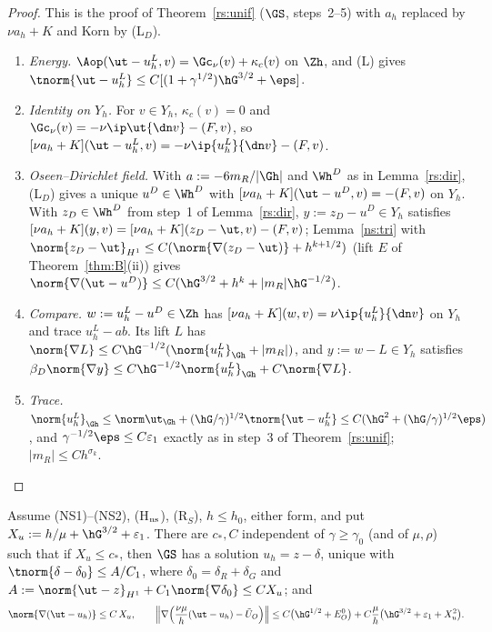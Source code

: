 \begin{proof}
This is the proof of Theorem~\ref{rs:unif} ($\GS$, steps~2--5) with $a_h$ replaced by $\nu a_h+K$ and Korn by (L$_D$).
\begin{enumerate}
\item \emph{Energy.} $\Aop(\ut-u^L_h,v)=\Gc_\nu(v)+\kappa_c(v)$ on $\Zh$, and (L) gives $\tnorm{\ut-u^L_h}\le C[(1+\gamma^{1/2})\hG^{3/2}+\eps]$.
\item \emph{Identity on $Y_h$.} For $v\in Y_h$, $\kappa_c(v)=0$ and $\Gc_\nu(v)=-\nu\ip\ut{\dn v}-(F,v)$, so
$[\nu a_h+K](\ut-u^L_h,v)=-\nu\ip{u^L_h}{\dn v}-(F,v)$.
\item \emph{Oseen--Dirichlet field.} With $a:=-6m_R/|\Gh|$ and $\Wh^D$ as in Lemma~\ref{rs:dir}, (L$_D$) gives a unique $u^D\in\Wh^D$ with
$[\nu a_h+K](\ut-u^D,v)=-(F,v)$ on $Y_h$. With $z_D\in\Wh^D$ from step~1 of Lemma~\ref{rs:dir}, $y:=z_D-u^D\in Y_h$ satisfies
$[\nu a_h+K](y,v)=[\nu a_h+K](z_D-\ut,v)-(F,v)$; Lemma~\ref{ns:tri} with $\norm{z_D-\ut}_{H^1}\le C(\norm{\nabla(z_D-\ut)}+h^{k+1/2})$ (lift $E$
of Theorem~\ref{thm:B}(ii)) gives $\norm{\nabla(\ut-u^D)}\le C(\hG^{3/2}+h^k+|m_R|\hG^{-1/2})$.
\item \emph{Compare.} $w:=u^L_h-u^D\in\Zh$ has $[\nu a_h+K](w,v)=\nu\ip{u^L_h}{\dn v}$ on $Y_h$ and trace $u^L_h-ab$. Its lift $L$ has
$\norm{\nabla L}\le C\hG^{-1/2}(\norm{u^L_h}_{\Gh}+|m_R|)$, and $y:=w-L\in Y_h$ satisfies $\beta_D\norm{\nabla y}\le C\hG^{-1/2}\norm{u^L_h}_{\Gh}+C\norm{\nabla L}$.
\item \emph{Trace.} $\norm{u^L_h}_{\Gh}\le\norm\ut_{\Gh}+(\hG/\gamma)^{1/2}\tnorm{\ut-u^L_h}\le C(\hG^2+(\hG/\gamma)^{1/2}\eps)$, and
$\gamma^{-1/2}\eps\le C\varepsilon_1$ exactly as in step~3 of Theorem~\ref{rs:unif}; $|m_R|\le Ch^{\sigma_k}$.\qedhere
\end{enumerate}
\end{proof}

\begin{theorem}\label{n2:unif:thm}
Assume (NS1)--(NS2), (H$_{\rm ns}$), (R$_S$), $h\le h_0$, either form, and put $X_u:=h/\mu+\hG^{3/2}+\varepsilon_1$. There are $c_\ast,C$
independent of $\gamma\ge\gamma_0$ (and of $\mu,\rho$) such that if $X_u\le c_\ast$, then $\GS$ has a solution $u_h=z-\delta$, unique with
$\tnorm{\delta-\delta_0}\le A/C_1$, where $\delta_0=\delta_R+\delta_G$ and $A:=\norm{\ut-z}_{H^1}+C_1\norm{\nabla\delta_0}\le CX_u$; and
\[
\norm{\nabla(\ut-u_h)}\le C\,X_u,\qquad
\Bigl\|\nabla\Bigl(\frac{\nu\mu}h(\ut-u_h)-\tilde U_O\Bigr)\Bigr\|\le C\bigl(\hG^{1/2}+E^0_O\bigr)+C\frac\mu h\bigl(\hG^{3/2}+\varepsilon_1+X_u^2\bigr).
\]
\end{theorem}

